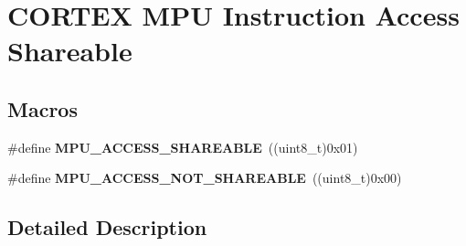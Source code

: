 \hypertarget{group___c_o_r_t_e_x___m_p_u___access___shareable}{}\section{C\+O\+R\+T\+EX M\+PU Instruction Access Shareable}
\label{group___c_o_r_t_e_x___m_p_u___access___shareable}
\subsection*{Macros}
\begin{DoxyCompactItemize}
\item 
\#define {\bfseries M\+P\+U\+\_\+\+A\+C\+C\+E\+S\+S\+\_\+\+S\+H\+A\+R\+E\+A\+B\+LE}~((uint8\+\_\+t)0x01)\hypertarget{group___c_o_r_t_e_x___m_p_u___access___shareable_ga419e41ee14138d50719cb3978010ec87}{}\label{group___c_o_r_t_e_x___m_p_u___access___shareable_ga419e41ee14138d50719cb3978010ec87}

\item 
\#define {\bfseries M\+P\+U\+\_\+\+A\+C\+C\+E\+S\+S\+\_\+\+N\+O\+T\+\_\+\+S\+H\+A\+R\+E\+A\+B\+LE}~((uint8\+\_\+t)0x00)\hypertarget{group___c_o_r_t_e_x___m_p_u___access___shareable_ga62bf75fcba9399ec5ed802701c4544d0}{}\label{group___c_o_r_t_e_x___m_p_u___access___shareable_ga62bf75fcba9399ec5ed802701c4544d0}

\end{DoxyCompactItemize}


\subsection{Detailed Description}
